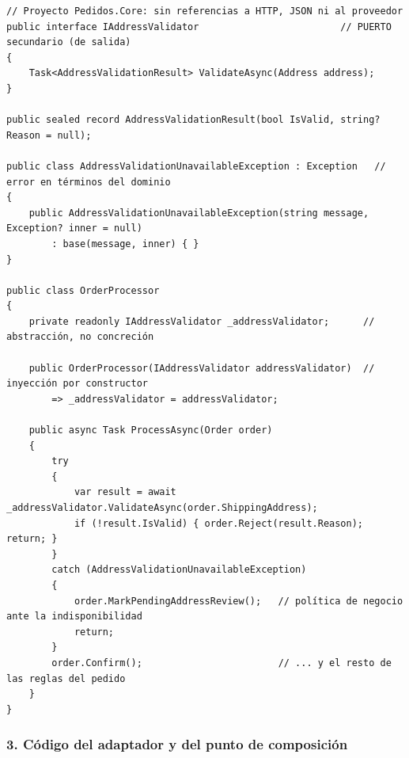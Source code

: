 \documentclass[11pt,a4paper]{article}
\begin{document}
\begin{lstlisting}[language={[Sharp]C}, basicstyle=\ttfamily\scriptsize]
// Proyecto Pedidos.Core: sin referencias a HTTP, JSON ni al proveedor
public interface IAddressValidator                         // PUERTO secundario (de salida)
{
    Task<AddressValidationResult> ValidateAsync(Address address);
}

public sealed record AddressValidationResult(bool IsValid, string? Reason = null);

public class AddressValidationUnavailableException : Exception   // error en términos del dominio
{
    public AddressValidationUnavailableException(string message, Exception? inner = null)
        : base(message, inner) { }
}

public class OrderProcessor
{
    private readonly IAddressValidator _addressValidator;      // abstracción, no concreción

    public OrderProcessor(IAddressValidator addressValidator)  // inyección por constructor
        => _addressValidator = addressValidator;

    public async Task ProcessAsync(Order order)
    {
        try
        {
            var result = await _addressValidator.ValidateAsync(order.ShippingAddress);
            if (!result.IsValid) { order.Reject(result.Reason); return; }
        }
        catch (AddressValidationUnavailableException)
        {
            order.MarkPendingAddressReview();   // política de negocio ante la indisponibilidad
            return;
        }
        order.Confirm();                        // ... y el resto de las reglas del pedido
    }
}
\end{lstlisting}

\subsubsection*{3. Código del adaptador y del punto de composición}
\end{document}
